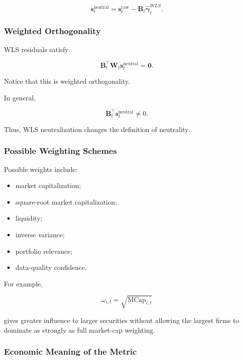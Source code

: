 \documentclass[11pt,a4paper]{article}
\begin{document}
\begin{equation}
\boxed{
\mathbf{s}_t^{\mathrm{neutral}}
=
\mathbf{s}_t^{\mathrm{raw}}
-
\mathbf{B}_t
\widehat{\boldsymbol{\gamma}}_t^{WLS}.
}
\end{equation}


\subsubsection{Weighted Orthogonality}

WLS residuals satisfy

\begin{equation}
\boxed{
\mathbf{B}_t^\top
\mathbf{W}_t
\mathbf{s}_t^{\mathrm{neutral}}
=
\mathbf{0}.
}
\end{equation}

Notice that this is weighted orthogonality.

In general,

\begin{equation}
\mathbf{B}_t^\top
\mathbf{s}_t^{\mathrm{neutral}}
\neq
0.
\end{equation}

Thus, WLS neutralization changes the definition of neutrality.


\subsubsection{Possible Weighting Schemes}

Possible weights include:

\begin{itemize}
    \item market capitalization;
    \item square-root market capitalization;
    \item liquidity;
    \item inverse variance;
    \item portfolio relevance;
    \item data-quality confidence.
\end{itemize}

For example,

\begin{equation}
\omega_{i,t}
=
\sqrt{
\mathrm{MCap}_{i,t}
}
\end{equation}

gives greater influence to larger securities without allowing the largest firms
to dominate as strongly as full market-cap weighting.


\subsubsection{Economic Meaning of the Metric}
\end{document}
